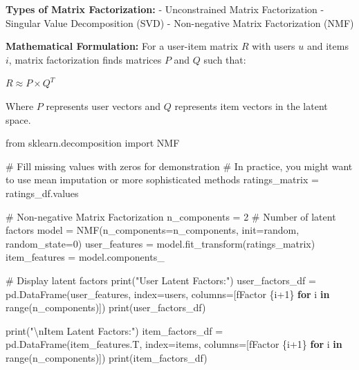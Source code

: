 \documentclass[
  letterpaper,
  DIV=11,
  numbers=noendperiod]{scrreprt}
\newenvironment{Shaded}{\begin{snugshade}}{\end{snugshade}}
\newcommand{\BuiltInTok}[1]{\textcolor[rgb]{0.00,0.23,0.31}{#1}}
\newcommand{\CharTok}[1]{\textcolor[rgb]{0.13,0.47,0.30}{#1}}
\newcommand{\CommentTok}[1]{\textcolor[rgb]{0.37,0.37,0.37}{#1}}
\newcommand{\ControlFlowTok}[1]{\textcolor[rgb]{0.00,0.23,0.31}{\textbf{#1}}}
\newcommand{\DecValTok}[1]{\textcolor[rgb]{0.68,0.00,0.00}{#1}}
\newcommand{\ImportTok}[1]{\textcolor[rgb]{0.00,0.46,0.62}{#1}}
\newcommand{\KeywordTok}[1]{\textcolor[rgb]{0.00,0.23,0.31}{\textbf{#1}}}
\newcommand{\NormalTok}[1]{\textcolor[rgb]{0.00,0.23,0.31}{#1}}
\newcommand{\OperatorTok}[1]{\textcolor[rgb]{0.37,0.37,0.37}{#1}}
\newcommand{\SpecialCharTok}[1]{\textcolor[rgb]{0.37,0.37,0.37}{#1}}
\newcommand{\SpecialStringTok}[1]{\textcolor[rgb]{0.13,0.47,0.30}{#1}}
\newcommand{\StringTok}[1]{\textcolor[rgb]{0.13,0.47,0.30}{#1}}
\begin{document}
\textbf{Types of Matrix Factorization:} - Unconstrained Matrix
Factorization - Singular Value Decomposition (SVD) - Non-negative Matrix
Factorization (NMF)

\textbf{Mathematical Formulation:} For a user-item matrix \(R\) with
users \(u\) and items \(i\), matrix factorization finds matrices \(P\)
and \(Q\) such that:

\(R \approx P \times Q^T\)

Where \(P\) represents user vectors and \(Q\) represents item vectors in
the latent space.

\begin{Shaded}
\begin{Highlighting}[]
\ImportTok{from}\NormalTok{ sklearn.decomposition }\ImportTok{import}\NormalTok{ NMF}

\CommentTok{\# Fill missing values with zeros for demonstration}
\CommentTok{\# In practice, you might want to use mean imputation or more sophisticated methods}
\NormalTok{ratings\_matrix }\OperatorTok{=}\NormalTok{ ratings\_df.values}

\CommentTok{\# Non{-}negative Matrix Factorization}
\NormalTok{n\_components }\OperatorTok{=} \DecValTok{2}  \CommentTok{\# Number of latent factors}
\NormalTok{model }\OperatorTok{=}\NormalTok{ NMF(n\_components}\OperatorTok{=}\NormalTok{n\_components, init}\OperatorTok{=}\StringTok{\textquotesingle{}random\textquotesingle{}}\NormalTok{, random\_state}\OperatorTok{=}\DecValTok{0}\NormalTok{)}
\NormalTok{user\_features }\OperatorTok{=}\NormalTok{ model.fit\_transform(ratings\_matrix)}
\NormalTok{item\_features }\OperatorTok{=}\NormalTok{ model.components\_}

\CommentTok{\# Display latent factors}
\BuiltInTok{print}\NormalTok{(}\StringTok{"User Latent Factors:"}\NormalTok{)}
\NormalTok{user\_factors\_df }\OperatorTok{=}\NormalTok{ pd.DataFrame(user\_features, index}\OperatorTok{=}\NormalTok{users, }
\NormalTok{                             columns}\OperatorTok{=}\NormalTok{[}\SpecialStringTok{f\textquotesingle{}Factor }\SpecialCharTok{\{}\NormalTok{i}\OperatorTok{+}\DecValTok{1}\SpecialCharTok{\}}\SpecialStringTok{\textquotesingle{}} \ControlFlowTok{for}\NormalTok{ i }\KeywordTok{in} \BuiltInTok{range}\NormalTok{(n\_components)])}
\BuiltInTok{print}\NormalTok{(user\_factors\_df)}

\BuiltInTok{print}\NormalTok{(}\StringTok{"}\CharTok{\textbackslash{}n}\StringTok{Item Latent Factors:"}\NormalTok{)}
\NormalTok{item\_factors\_df }\OperatorTok{=}\NormalTok{ pd.DataFrame(item\_features.T, index}\OperatorTok{=}\NormalTok{items, }
\NormalTok{                             columns}\OperatorTok{=}\NormalTok{[}\SpecialStringTok{f\textquotesingle{}Factor }\SpecialCharTok{\{}\NormalTok{i}\OperatorTok{+}\DecValTok{1}\SpecialCharTok{\}}\SpecialStringTok{\textquotesingle{}} \ControlFlowTok{for}\NormalTok{ i }\KeywordTok{in} \BuiltInTok{range}\NormalTok{(n\_components)])}
\BuiltInTok{print}\NormalTok{(item\_factors\_df)}


\end{Highlighting}
\end{Shaded}
\end{document}

